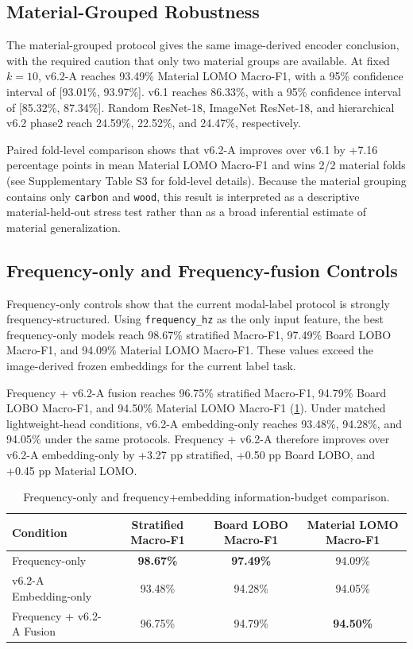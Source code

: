 \documentclass[review,3p,times]{elsarticle}
\begin{document}
\subsection{Material-Grouped Robustness}
The material-grouped protocol gives the same image-derived encoder conclusion, with the required caution that only two material groups are available. At fixed $k=10$, v6.2-A reaches 93.49\% Material LOMO Macro-F1, with a 95\% confidence interval of [93.01\%, 93.97\%]. v6.1 reaches 86.33\%, with a 95\% confidence interval of [85.32\%, 87.34\%]. Random ResNet-18, ImageNet ResNet-18, and hierarchical v6.2 phase2 reach 24.59\%, 22.52\%, and 24.47\%, respectively.

Paired fold-level comparison shows that v6.2-A improves over v6.1 by +7.16 percentage points in mean Material LOMO Macro-F1 and wins 2/2 material folds (see Supplementary Table S3 for fold-level details). Because the material grouping contains only \texttt{carbon} and \texttt{wood}, this result is interpreted as a descriptive material-held-out stress test rather than as a broad inferential estimate of material generalization.

\subsection{Frequency-only and Frequency-fusion Controls}
Frequency-only controls show that the current modal-label protocol is strongly frequency-structured. Using \texttt{frequency\_hz} as the only input feature, the best frequency-only models reach 98.67\% stratified Macro-F1, 97.49\% Board LOBO Macro-F1, and 94.09\% Material LOMO Macro-F1. These values exceed the image-derived frozen embeddings for the current label task.

Frequency + v6.2-A fusion reaches 96.75\% stratified Macro-F1, 94.79\% Board LOBO Macro-F1, and 94.50\% Material LOMO Macro-F1 (\cref{tab:table7}). Under matched lightweight-head conditions, v6.2-A embedding-only reaches 93.48\%, 94.28\%, and 94.05\% under the same protocols. Frequency + v6.2-A therefore improves over v6.2-A embedding-only by +3.27 pp stratified, +0.50 pp Board LOBO, and +0.45 pp Material LOMO.

\begin{table}[htbp]
\centering
\caption{Frequency-only and frequency+embedding information-budget comparison.}
\label{tab:table7}
\begin{tabular}{lccc}
\toprule
\textbf{Condition} & \textbf{Stratified Macro-F1} & \textbf{Board LOBO Macro-F1} & \textbf{Material LOMO Macro-F1} \\
\midrule
Frequency-only & \textbf{98.67\%} & \textbf{97.49\%} & 94.09\% \\
v6.2-A Embedding-only & 93.48\% & 94.28\% & 94.05\% \\
Frequency + v6.2-A Fusion & 96.75\% & 94.79\% & \textbf{94.50\%} \\
\bottomrule
\end{tabular}
\end{table}
\end{document}
